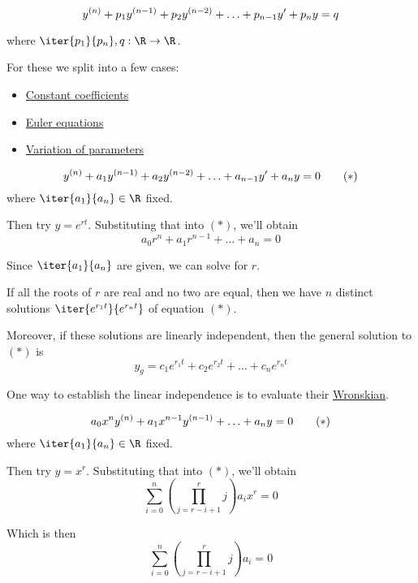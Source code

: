 
\begin{equation*}\def\y#1{y^{(#1)}}
	\y n+p_1\y{n-1}+p_2\y{n-2}+\ldots+p_{n-1}y'+p_ n y=q
\end{equation*}

where $\iter{p_1}{p_n},q:\R\to\R$.

For these we split into a few cases:
\begin{itemize}
	\item\hyperref[cd8a29a]{Constant coefficients}
	\item\hyperref[a0f8e0c]{Euler equations}
	\item\hyperref[de785b7]{Variation of parameters}
\end{itemize}

\label{cd8a29a}

\begin{equation*}\def\y#1{y^{(#1)}}
	\y n+a_1\y{n-1}+a_2\y{n-2}+\ldots+a_{n-1}y'+a_ny=0\tag*{($*$)}
\end{equation*}
where $\iter{a_1}{a_n}\in\R$ fixed.

Then try $y=e^{rt}$. Substituting that into $(*)$, we'll obtain
$$a_0r^n+a_1r^{n-1}+\ldots+a_n=0$$

Since $\iter{a_1}{a_n}$ are given, we can solve for $r$.

If all the roots of $r$ are real and no two are equal, then we have
$n$ distinct solutions $\iter{e^{r_1t}}{e^{r_nt}}$ of equation $(*)$.

Moreover, if these solutions are linearly independent, then the
general solution to $(*)$ is
$$y_g=c_1e^{r_1t}+c_2e^{r_2t}+\ldots+c_ne^{r_nt}$$

One way to establish the linear independence is to evaluate their
\hyperref[b70073b]{Wronskian}.

\label{a0f8e0c}

\begin{equation*}\def\y#1{x^{#1}y^{(#1)}}
	a_0\y{n}+a_1\y{n-1}+\ldots+a_ny=0\tag*{($*$)}
\end{equation*}
where $\iter{a_1}{a_n}\in\R$ fixed.

Then try $y=x^{r}$. Substituting that into $(*)$, we'll obtain
$$
	\sum_{i=0}^n\left(\prod_{j=r-i+1}^rj\right) a_ix^r=0
$$

Which is then
$$
	\sum_{i=0}^n\left(\prod_{j=r-i+1}^rj\right) a_i=0
$$

\label{de785b7}

